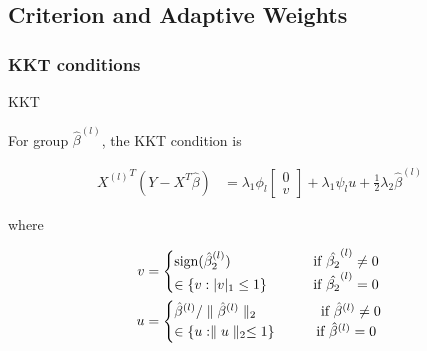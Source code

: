 \documentclass[12pt]{article}
\begin{document}
\subsection{Criterion and Adaptive Weights} 

\subsubsection{KKT conditions}

KKT \cite{tibshirani2013lasso}

For group $\hat{\beta}^{(l)}$, the KKT condition is 

\begin{equation} \label{KKT}
  \begin{split}
  {X^{(l)}}^T(Y-X^T\hat{\beta}) &= \lambda_1\phi_l \begin{bmatrix}
         0 \\
         v 
       \end{bmatrix}
       + \lambda_1\psi_lu+\frac{1}{2}\lambda_2\hat{\beta}^{(l)}
  \end{split}
\end{equation}

where

\begin{align}
v & = \begin{cases}
  \text{sign}(\hat{\beta}_2^{(l)}) & \text{ \qquad  if $\hat{\beta_2}^{(l)}\neq 0$} \\
  \in\{v:|v|_1\leq 1\}&  \text{ \qquad  if $\hat{\beta_2}^{(l)}= 0$} 
\end{cases}
\\
u & = \begin{cases} 
  \hat{\beta}^{(l)}/\parallel \hat{\beta}^{(l)} \parallel_2 & 
  \text{ \qquad  if $\hat{\beta}^{(l)}\neq 0$} \\
  \in \{u:\parallel u\parallel_2\leq 1\} & \text{\qquad if $\hat{\beta}^{(l)}= 0$}
\end{cases} 
\end{align}
\end{document}
